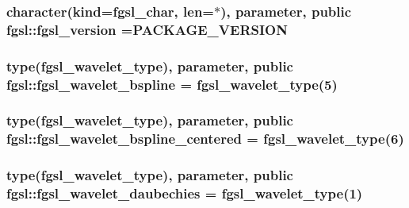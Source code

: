 \subsubsection[{fgsl\+\_\+version}]{\setlength{\rightskip}{0pt plus 5cm}character(kind={\bf fgsl\+\_\+char}, len=$\ast$), parameter, public fgsl\+::fgsl\+\_\+version =P\+A\+C\+K\+A\+G\+E\+\_\+\+V\+E\+R\+S\+I\+O\+N}\label{namespacefgsl_a3443bae7bac02745f1562e6c2f891656}
\hypertarget{namespacefgsl_a6fb8d8501c5f52d65dd32be21f7a8431}{}
\subsubsection[{fgsl\+\_\+wavelet\+\_\+bspline}]{\setlength{\rightskip}{0pt plus 5cm}type({\bf fgsl\+\_\+wavelet\+\_\+type}), parameter, public fgsl\+::fgsl\+\_\+wavelet\+\_\+bspline = {\bf fgsl\+\_\+wavelet\+\_\+type}(5)}\label{namespacefgsl_a6fb8d8501c5f52d65dd32be21f7a8431}
\hypertarget{namespacefgsl_a61c7f4e05d439d135784a3d84e7f9b3a}{}
\subsubsection[{fgsl\+\_\+wavelet\+\_\+bspline\+\_\+centered}]{\setlength{\rightskip}{0pt plus 5cm}type({\bf fgsl\+\_\+wavelet\+\_\+type}), parameter, public fgsl\+::fgsl\+\_\+wavelet\+\_\+bspline\+\_\+centered = {\bf fgsl\+\_\+wavelet\+\_\+type}(6)}\label{namespacefgsl_a61c7f4e05d439d135784a3d84e7f9b3a}
\hypertarget{namespacefgsl_a67c3173fcd7991624114d64eb31bf6d8}{}
\subsubsection[{fgsl\+\_\+wavelet\+\_\+daubechies}]{\setlength{\rightskip}{0pt plus 5cm}type({\bf fgsl\+\_\+wavelet\+\_\+type}), parameter, public fgsl\+::fgsl\+\_\+wavelet\+\_\+daubechies = {\bf fgsl\+\_\+wavelet\+\_\+type}(1)}\label{namespacefgsl_a67c3173fcd7991624114d64eb31bf6d8}
\hypertarget{namespacefgsl_a26df4eaadbaa474bae2dca6abdaea27f}{}
